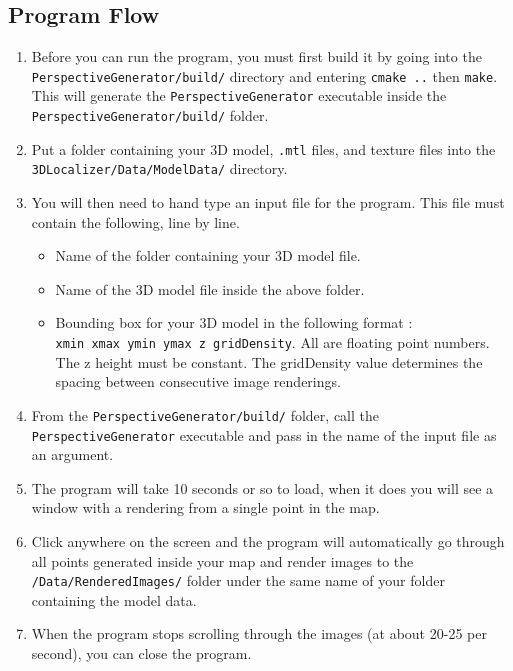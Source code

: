 \documentclass[a4paper,11pt]{article}
\begin{document}
        \subsection{Program Flow}
	\begin{enumerate}
	 \item Before you can run the program, you must first build it by going into the \texttt{PerspectiveGenerator/build/} directory and entering \texttt{cmake ..} then \texttt{make}.
	 This will generate the \texttt{PerspectiveGenerator} executable inside the \texttt{PerspectiveGenerator/build/} folder. 
	 \item Put a folder containing your 3D model, \texttt{.mtl} files, and texture files into the \texttt{3DLocalizer/Data/ModelData/} directory. 
	 \item You will then need to hand type an input file for the program. This file must contain the following, line by line.
	  \begin{itemize}
	  \item Name of the folder containing your 3D model file.
	  \item Name of the 3D model file inside the above folder.
	  \item Bounding box for your 3D model in the following format : \\ \texttt{xmin xmax ymin ymax z gridDensity}. All are floating point numbers. The z height must be constant.
	  The gridDensity value determines the spacing between consecutive image renderings.
	  \end{itemize}
	\item From the \texttt{PerspectiveGenerator/build/} folder, call the \texttt{PerspectiveGenerator} executable and pass in the name of the input file as an argument.
	\item The program will take 10 seconds or so to load, when it does you will see a window with a rendering from a single point in the map. 
	\item Click anywhere on the screen and the program will automatically go through all points generated inside your map and render images to the \texttt{/Data/RenderedImages/} folder
	under the same name of your folder containing the model data.
	\item When the program stops scrolling through the images (at about 20-25 per second), you can close the program.
	\end{enumerate}
\end{document}
